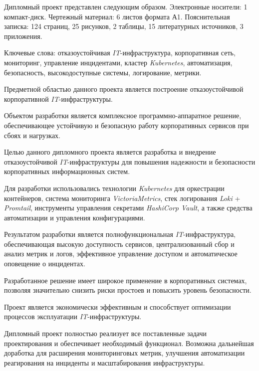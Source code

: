 Дипломный проект представлен следующим образом. Электронные носители: 1 компакт-диск. Чертежный материал: 6 листов формата А1. Пояснительная записка: 124 страниц, 25 рисунков, 2 таблицы, 15 литературных источников, 3 приложения.

Ключевые слова: отказоустойчивая \textit{IT}-инфраструктура, корпоративная сеть, мониторинг, управление инцидентами, кластер \textit{Kubernetes}, автоматизация, безопасность, высокодоступные системы, логирование, метрики.

Предметной областью данного проекта является построение отказоустойчивой корпоративной \textit{IT}-инфраструктуры.

Объектом разработки является комплексное программно-аппаратное решение, обеспечивающее устойчивую и безопасную работу корпоративных сервисов при сбоях и нагрузках.

Целью данного дипломного проекта является разработка и внедрение отказоустойчивой \textit{IT}-инфраструктуры для повышения надежности и безопасности корпоративных информационных систем.

Для разработки использовались технологии \textit{Kubernetes} для оркестрации контейнеров, система мониторинга \textit{VictoriaMetrics}, стек логирования \textit{Loki} + \textit{Promtail}, инструменты управления секретами \textit{HashiCorp Vault}, а также средства автоматизации и управления конфигурациями.

Результатом разработки является полнофункциональная \textit{IT}-инфраструктура, обеспечивающая высокую доступность сервисов, централизованный сбор и анализ метрик и логов, эффективное управление доступом и автоматическое оповещение о инцидентах.

Разработанное решение имеет широкое применение в корпоративных системах, позволяя значительно снизить риски простоев и повысить уровень безопасности.

Проект является экономически эффективным и способствует оптимизации процессов эксплуатации \textit{IT}-инфраструктуры.

Дипломный проект полностью реализует все поставленные задачи проектирования и обеспечивает необходимый функционал. Возможна дальнейшая доработка для расширения мониторинговых метрик, улучшения автоматизации реагирования на инциденты и масштабирования инфраструктуры.

\newpage